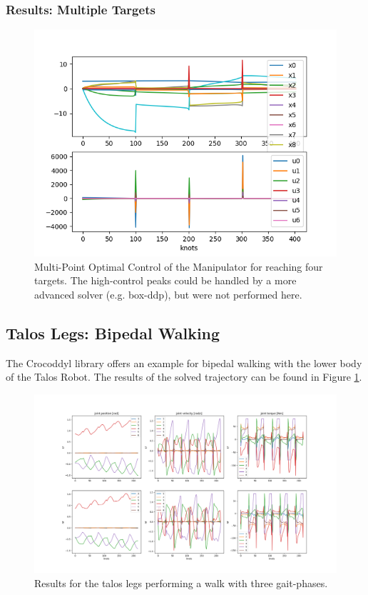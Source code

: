 \subsubsection{Results: Multiple Targets}
\begin{figure}[h!]
\centering
\includegraphics[width=1\linewidth]{Media/Crocoddyl/ExArm/ArmSolution.png}
\caption{Multi-Point Optimal Control of the Manipulator for reaching four targets. The high-control peaks could be handled by a more advanced solver (e.g. box-ddp), but were not performed here.}
\end{figure}

\subsection{Talos Legs: Bipedal Walking}
The Crocoddyl library offers an example for bipedal walking with the lower body of the Talos \cite{stasse2017talos} Robot. The results of the solved trajectory can be found in Figure \ref{fig:TalosGait}. 

\begin{figure}[h!]
\centering
\includegraphics[width=1\linewidth]{Media/Crocoddyl/ExBiped/TalosGait_Solution.png}
\caption{Results for the talos legs performing a walk with three gait-phases.}
\label{fig:TalosGait}
\end{figure}

